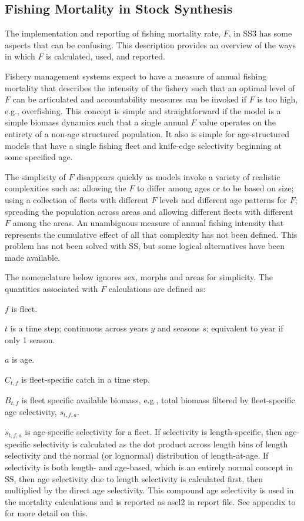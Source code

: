 \subsection{Fishing Mortality in Stock Synthesis}

The implementation and reporting of fishing mortality rate, $F$, in SS3 has some aspects that can be confusing.  This description provides an overview of the ways in which $F$ is calculated, used, and reported.  

Fishery management systems expect to have a measure of annual fishing mortality that describes the intensity of the fishery such that an optimal level of $F$ can be articulated and accountability measures can be invoked if $F$ is too high, e.g., overfishing.  This concept is simple and straightforward if the model is a simple biomass dynamics such that a single annual $F$ value operates on the entirety of a non-age structured population. It also is simple for age-structured models that have a single fishing fleet and knife-edge selectivity beginning at some specified age.

The simplicity of $F$ disappears quickly as models invoke a variety of realistic complexities such as: allowing the $F$ to differ among ages or to be based on size; using a collection of fleets with different $F$ levels and different age patterns for $F$; spreading the population across areas and allowing different fleets with different $F$ among the areas.  An unambiguous measure of annual fishing intensity that represents the cumulative effect of all that complexity has not been defined.  This problem has not been solved with SS, but some logical alternatives have been made available.

The nomenclature below ignores sex, morphs and areas for simplicity. The quantities associated with $F$ calculations are defined as:

$f$ is fleet.

$t$ is a time step; continuous across years $y$ and seasons $s$; equivalent to year if only 1 season.

$a$ is age.

$C_{t,f}$ is fleet-specific catch in a time step.

$B_{t,f}$ is fleet specific available biomass, e.g., total biomass filtered by fleet-specific age selectivity, $s_{t,f,a}$.

$s_{t,f,a}$ is age-specific selectivity for a fleet. If selectivity is length-specific, then age-specific selectivity is calculated as the dot product across length bins of length selectivity and the normal (or lognormal) distribution of length-at-age.  If selectivity is both length- and age-based, which is an entirely normal concept in SS, then age selectivity due to length selectivity is calculated first, then multiplied by the direct age selectivity.  This compound age selectivity is used in the mortality calculations and is reported as asel2 in report file.  See appendix to \citet{methotstock2013} for more detail on this.

